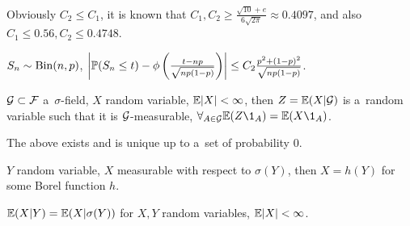 	\begin{remark}
		Obviously $C_2 \leq C_1$, it is known that
		$C_1, C_2 \geq \frac{\sqrt{10}+e}{6 \sqrt{2\pi}} \approx 0.4097$,
		and also $C_1 \leq 0.56, C_2 \leq 0.4748$.
	\end{remark}
	
	\begin{example}
		$S_n \sim \mr{Bin}(n,p)$,
		$\left|\P(S_n \leq t) -\phi\left(\frac{t - np}{\sqrt{n p (1-p)}} \right) \right|
		\leq C_2 \frac{p^2 + (1-p)^2}{\sqrt{np(1-p)}}$.
	\end{example}
	
	\begin{definition}
		$\G \subset \F$ a~$\sigma$-field, $X$ random variable, $\E |X|<\infty$,
		then $Z=\E(X|\G)$ is a~random variable such that
		it is $\G$-measurable, $\forall_{A \in \G} \E(Z \1_A) = \E(X \1_A)$.
	\end{definition}
	
	\begin{proposition}
		The above exists and is unique up to a~set of probability 0.
	\end{proposition}

	
	\begin{proposition}
		$Y$ random variable, $X$ measurable with respect to $\sigma(Y)$,
		then $X=h(Y)$ for some Borel function $h$.
	\end{proposition}
	
	\begin{definition}
		$\E(X|Y) = \E(X | \sigma(Y))$ for $X, Y$ random variables, $\E |X|<\infty$.
	\end{definition}



	
	

 
 
